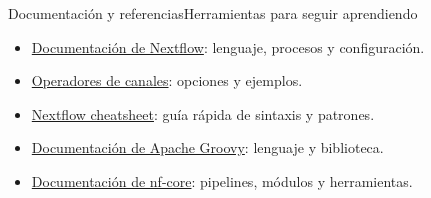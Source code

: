 \documentclass[handout,aspectratio=169,10pt]{beamer}
\begin{document}
\begin{frame}{Documentación y referencias}{Herramientas para seguir aprendiendo}
\begin{itemize}\setlength\itemsep{8pt}
\item \href{https://www.nextflow.io/docs/latest/}{Documentación de Nextflow}: lenguaje, procesos y configuración.
\item \href{https://docs.seqera.io/nextflow/reference/operator/}{Operadores de canales}: opciones y ejemplos.
\item \href{https://github.com/chlazaris/Nextflow_training/blob/main/nextflow_cheatsheet.md}{Nextflow cheatsheet}: guía rápida de sintaxis y patrones.
\item \href{https://groovy-lang.org/documentation.html}{Documentación de Apache Groovy}: lenguaje y biblioteca.
\item \href{https://nf-co.re/docs/}{Documentación de nf-core}: pipelines, módulos y herramientas.
\end{itemize}
\end{frame}
\end{document}
